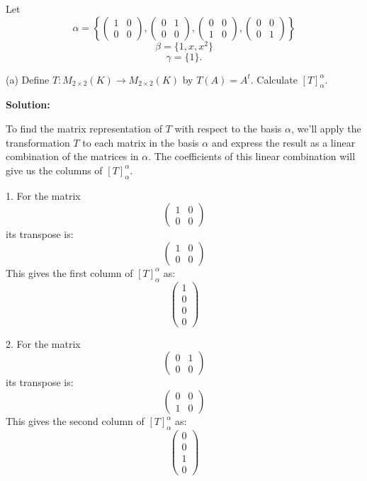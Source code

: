 \documentclass{article}
\begin{document}
	
	Let
	\[
	\alpha = 
	\left\{
	\begin{pmatrix}
		1 & 0 \\
		0 & 0
	\end{pmatrix},
	\begin{pmatrix}
		0 & 1 \\
		0 & 0
	\end{pmatrix},
	\begin{pmatrix}
		0 & 0 \\
		1 & 0
	\end{pmatrix},
	\begin{pmatrix}
		0 & 0 \\
		0 & 1
	\end{pmatrix}
	\right\}
	\]
	\[
	\beta = \{1, x, x^2\}
	\]
	\[
	\gamma = \{1\}.
	\]
	
	(a) Define \( T: M_{2\times2} (K) \to M_{2\times2} (K) \) by \( T(A) = A^t \). Calculate \([T]_{\alpha}^{\alpha}\).
	
	\textbf{Solution:}
	
	To find the matrix representation of \( T \) with respect to the basis \( \alpha \), we'll apply the transformation \( T \) to each matrix in the basis \( \alpha \) and express the result as a linear combination of the matrices in \( \alpha \). The coefficients of this linear combination will give us the columns of \([T]_{\alpha}^{\alpha}\).
	
	1. For the matrix 
	\[
	\begin{pmatrix}
		1 & 0 \\
		0 & 0
	\end{pmatrix}
	\]
	its transpose is:
	\[
	\begin{pmatrix}
		1 & 0 \\
		0 & 0
	\end{pmatrix}
	\]
	This gives the first column of \([T]_{\alpha}^{\alpha}\) as:
	\[ \begin{pmatrix}
		1 \\
		0 \\
		0 \\
		0
	\end{pmatrix} \]
	
	2. For the matrix 
	\[
	\begin{pmatrix}
		0 & 1 \\
		0 & 0
	\end{pmatrix}
	\]
	its transpose is:
	\[
	\begin{pmatrix}
		0 & 0 \\
		1 & 0
	\end{pmatrix}
	\]
	This gives the second column of \([T]_{\alpha}^{\alpha}\) as:
	\[ \begin{pmatrix}
		0 \\
		0 \\
		1 \\
		0
	\end{pmatrix} \]
	
\end{document}
